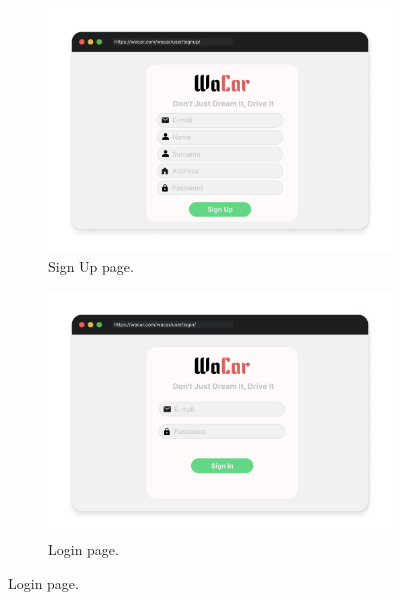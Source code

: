 \begin{figure} [H]
	\centering
	\begin{subfigure}{.5\textwidth}
	  \centering
	    \includegraphics[width=1\textwidth]{mockup/SignUp.png}
	    \caption{Sign Up page.}
	    \label{fig:signup}
	\end{subfigure}%
	\begin{subfigure}{.5\textwidth}
	    \centering
	    \includegraphics[width=1\textwidth]{mockup/Sign in.png}
	    \caption{Login page.}
	    \label{fig:signin}
	\end{subfigure}
\end{figure}

